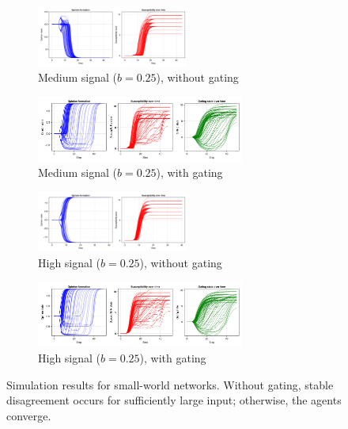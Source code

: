 \documentclass[]{article}
\begin{document}
\begin{figure}
	\begin{subfigure}{\linewidth}
		\centering
		\includegraphics[width=0.55\textwidth]{../plots/nvar0_nog_homd_medsig_g05_ws4_s92391} 
		\caption{Medium signal ($b = 0.25$), without gating}  \label{fig:ws11}
	\end{subfigure}
	
	\begin{subfigure}{\linewidth}
		\centering
		\includegraphics[width=0.75\textwidth]{../plots/nvar0_wg_homd_medsig_g05_ws4_a2_taux5_s92391}
		\caption{Medium signal ($b = 0.25$), with gating} \label{fig:ws12}
	\end{subfigure}
	
	\begin{subfigure}{\linewidth}
		\centering
		\includegraphics[width=0.55\textwidth]{../plots/nvar0_nog_homd_hisig_g05_ws4_s92391} 
		\caption{High signal ($b = 0.25$), without gating}  \label{fig:ws21}
	\end{subfigure}
	
	\begin{subfigure}{\linewidth}
		\centering
		\includegraphics[width=0.75\textwidth]{../plots/nvar0_wg_homd_hisig_g05_ws4_a2_taux5_s92391}
		\caption{High signal ($b = 0.25$), with gating} \label{fig:ws22}
	\end{subfigure}
	\caption{Simulation results for small-world networks. Without gating, stable disagreement occurs for sufficiently large input; otherwise, the agents converge.}
	\label{fig:wsgraph}
\end{figure}
\end{document}
